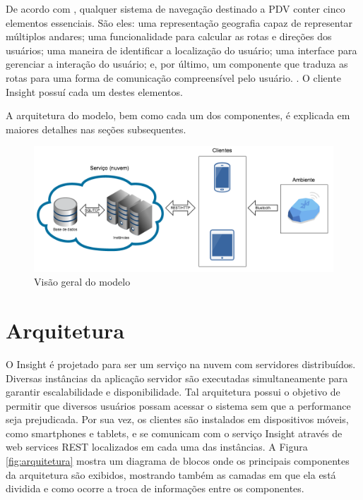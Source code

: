 \documentclass[english,brazilian]{UNISINOSmonografia}
\begin{document}
De acordo com , qualquer sistema de navegação destinado a PDV conter cinco elementos essenciais. São eles: uma representação geografia capaz de representar múltiplos andares; uma funcionalidade para calcular as rotas e direções dos usuários; uma maneira de identificar a localização do usuário; uma interface para gerenciar a interação do usuário; e, por último, um componente que traduza as rotas para uma forma de comunicação compreensível pelo usuário. \cite{gedawy2011designing}. O cliente Insight possuí cada um destes elementos.

A arquitetura do modelo, bem como cada um dos componentes, é explicada em maiores detalhes nas seções subsequentes.

\begin{figure}[!ht]
	\caption{Visão geral do modelo}
	\label{fig:visaoGeral}
	\centering%
	\begin{minipage}{.8\textwidth}
		\includegraphics[width=\textwidth]{imgs/visaoGeral}
	\end{minipage}
\end{figure}

	\section{Arquitetura}
O Insight é projetado para ser um serviço na nuvem com servidores distribuídos. Diversas instâncias da aplicação servidor são executadas simultaneamente para garantir escalabilidade e disponibilidade. Tal arquitetura possui o objetivo de permitir que diversos usuários possam acessar o sistema sem que a performance seja prejudicada. Por sua vez, os clientes são instalados em dispositivos móveis, como smartphones e tablets, e se comunicam com o serviço Insight através de web services REST localizados em cada uma das instâncias. A Figura \ref{fig:arquitetura} mostra um diagrama de blocos onde os principais componentes da arquitetura são exibidos, mostrando também as camadas em que ela está dividida e como ocorre a troca de informações entre os componentes. 
\end{document}
